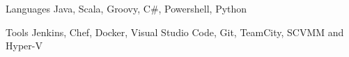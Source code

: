 

\begin{cvskills}

  \cvskill
    {Languages} %
    {Java, Scala, Groovy, C\#, Powershell, Python} %
  
  \cvskill
    {Tools} %
    {Jenkins, Chef, Docker, Visual Studio Code, Git, TeamCity, SCVMM and Hyper-V} %

\end{cvskills}
